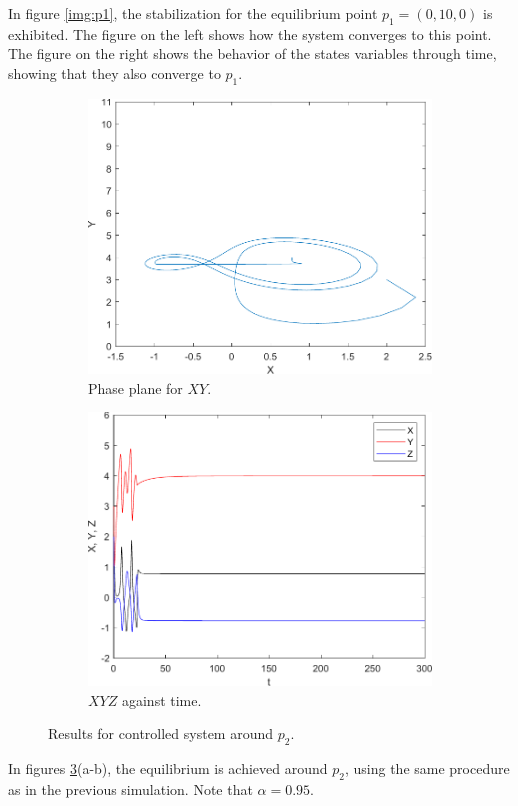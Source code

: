In figure \ref{img:p1}, the stabilization for the equilibrium point $p_1=(0,10,0)$ is exhibited. The figure on the left shows how the system converges to this point. The figure on the right shows the behavior of the states variables through time, showing that they also converge to $p_1$.
\begin{figure}[H]
  \centering
  \begin{subfigure}[H]{0.4\textwidth}
    \includegraphics[scale = 0.5]{files/ctrlXvsYFixedq0_95.pdf}
    \centering
    \caption{Phase plane for $XY$.}
    \label{fig:p2fixedxy}
  \end{subfigure}
  \hspace{1cm}
  \begin{subfigure}[H]{0.4\textwidth}
    \includegraphics[scale = 0.5]{files/ctrlq0_95.pdf}
    \centering
    \caption{$XYZ$ against time.}
    \label{fig:p2fixedxyz}
  \end{subfigure}
  \caption{Results for controlled system around $p_2$.}
  \label{img:p2}
\end{figure}
In figures \ref{img:p2}(a-b), the equilibrium is achieved around $p_2$, using the same procedure as in the previous simulation. Note that $\alpha=0.95$.

